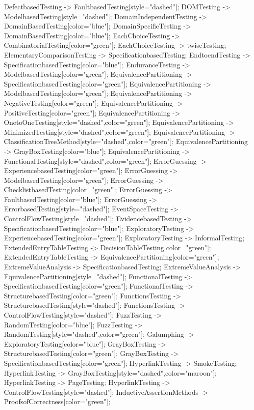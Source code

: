 \documentclass{article}
\begin{document}
{DefectbasedTesting -> FaultbasedTesting[style="dashed"];
DOMTesting -> ModelbasedTesting[style="dashed"];
DomainIndependentTesting -> DomainBasedTesting[color="blue"];
DomainSpecificTesting -> DomainBasedTesting[color="blue"];
EachChoiceTesting -> CombinatorialTesting[color="green"];
EachChoiceTesting -> twiseTesting;
ElementaryComparisonTesting -> SpecificationbasedTesting;
EndtoendTesting -> SpecificationbasedTesting[color="blue"];
EnduranceTesting -> ModelbasedTesting[color="green"];
EquivalencePartitioning -> SpecificationbasedTesting[color="green"];
EquivalencePartitioning -> ModelbasedTesting[color="green"];
EquivalencePartitioning -> NegativeTesting[color="green"];
EquivalencePartitioning -> PositiveTesting[color="green"];
EquivalencePartitioning -> OnetoOneTesting[style="dashed",color="green"];
EquivalencePartitioning -> MinimizedTesting[style="dashed",color="green"];
EquivalencePartitioning -> ClassificationTreeMethod[style="dashed",color="green"];
EquivalencePartitioning -> GrayBoxTesting[color="blue"];
EquivalencePartitioning -> FunctionalTesting[style="dashed",color="green"];
ErrorGuessing -> ExperiencebasedTesting[color="green"];
ErrorGuessing -> ModelbasedTesting[color="green"];
ErrorGuessing -> ChecklistbasedTesting[color="green"];
ErrorGuessing -> FaultbasedTesting[color="blue"];
ErrorGuessing -> ErrorbasedTesting[style="dashed"];
EventSpaceTesting -> ControlFlowTesting[style="dashed"];
EvidencebasedTesting -> SpecificationbasedTesting[color="blue"];
ExploratoryTesting -> ExperiencebasedTesting[color="green"];
ExploratoryTesting -> InformalTesting;
ExtendedEntryTableTesting -> DecisionTableTesting[color="green"];
ExtendedEntryTableTesting -> EquivalencePartitioning[color="green"];
ExtremeValueAnalysis -> SpecificationbasedTesting;
ExtremeValueAnalysis -> EquivalencePartitioning[style="dashed"];
FunctionalTesting -> SpecificationbasedTesting[color="green"];
FunctionalTesting -> StructurebasedTesting[color="green"];
FunctionsTesting -> StructurebasedTesting[style="dashed"];
FunctionsTesting -> ControlFlowTesting[style="dashed"];
FuzzTesting -> RandomTesting[color="blue"];
FuzzTesting -> RandomTesting[style="dashed",color="green"];
Galumphing -> ExploratoryTesting[color="blue"];
GrayBoxTesting -> StructurebasedTesting[color="green"];
GrayBoxTesting -> SpecificationbasedTesting[color="green"];
HyperlinkTesting -> SmokeTesting;
HyperlinkTesting -> GrayBoxTesting[style="dashed",color="maroon"];
HyperlinkTesting -> PageTesting;
HyperlinkTesting -> ControlFlowTesting[style="dashed"];
InductiveAssertionMethods -> ProofsofCorrectness[color="green"];
}
\end{document}
